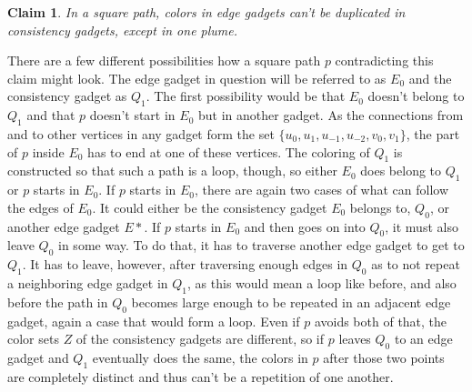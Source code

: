 \documentclass[12pt,a4paper]{article}
\newtheorem{claim}{Claim}
\begin{document}
\begin{claim}
In a square path, colors in edge gadgets can't be duplicated in consistency gadgets, except in one plume.
\end{claim} 

There are a few different possibilities how a square path $p$ contradicting this claim might look. The edge gadget in question will be referred to as $E_0$ and the consistency gadget as $Q_1$. 
\newline
The first possibility would be that $E_0$ doesn't belong to $Q_1$ and that $p$ doesn't start in $E_0$ but in another gadget. As the connections from and to other vertices in any gadget form the set $ \{u_0, u_1, u_{-1}, u_{-2}, v_0, v_1 \}$, the part of $p$ inside $E_0$ has to end at one of these vertices. The coloring of $Q_1$ is constructed so that such a path is a loop, though, so either $E_0$ does belong to $Q_1$ or $p$ starts in $E_0$.
\newline
If $p$ starts in $E_0$, there are again two cases of what can follow the edges of $E_0$. It could either be the consistency gadget $E_0$ belongs to, $Q_0$, or another edge gadget $E*$.
\newline
If $p$ starts in $E_0$ and then goes on into $Q_0$, it must also leave $Q_0$ in some way. To do that, it has to traverse another edge gadget to get to $Q_1$. It has to leave, however, after traversing enough edges in $Q_0$ as to not repeat a neighboring edge gadget in $Q_1$, as this would mean a loop like before, and also before the path in $Q_0$ becomes large enough to be repeated in an adjacent edge gadget, again a case that would form a loop. Even if $p$ avoids both of that, the color sets $Z$ of the consistency gadgets are different, so if $p$ leaves $Q_0$ to an edge gadget and $Q_1$ eventually does the same, the colors in $p$ after those two points are completely distinct and thus can't be a repetition of one another.
\newline
\end{document}
